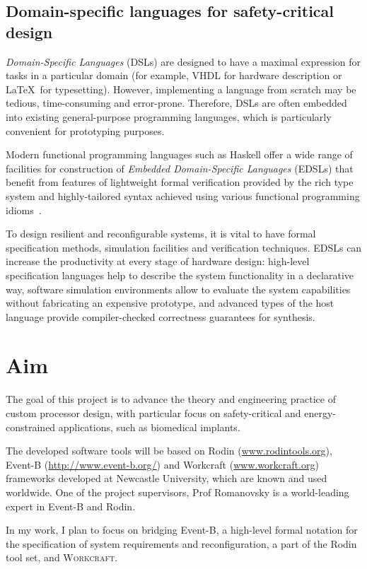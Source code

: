 \documentclass[10pt, a4paper]{article}
\begin{document}
\subsection{Domain-specific languages for safety-critical design}

\emph{Domain-Specific Languages} (DSLs) are designed to have a maximal 
expression for tasks in a particular domain (for example, VHDL for hardware
description or \LaTeX~for typesetting). However, implementing a language
from scratch may be tedious, time-consuming and error-prone. Therefore,
DSLs are often embedded into existing general-purpose programming languages,
which is particularly convenient for prototyping purposes.

Modern functional programming languages such as Haskell offer a wide range of
facilities for construction of \emph{Embedded Domain-Specific Languages} (EDSLs)
that benefit from features of lightweight formal verification provided by the
rich type system and highly-tailored syntax achieved using various functional
programming idioms~\cite{Hudak:1998:MDS:551789.853532}.

To design resilient and reconfigurable systems, it is vital to have formal
specification methods, simulation facilities and verification techniques.
EDSLs can increase the productivity at every stage of hardware design:
high-level specification languages help to describe the system functionality
in a declarative way, software simulation environments allow to evaluate the
system capabilities without fabricating an expensive prototype, and advanced
types of the host language provide compiler-checked correctness guarantees for
synthesis.

\section{Aim} 

The goal of this project is to advance the theory and
engineering practice of custom processor design, with
particular focus on safety-critical and energy-constrained
applications, such as biomedical implants.

The developed software tools will be based on Rodin 
(\url{www.rodintools.org}), Event-B (\url{http://www.event-b.org/}) and
Workcraft (\url{www.workcraft.org}) frameworks developed at Newcastle
University, which are known and used worldwide. One of the project supervisors,
Prof Romanovsky is a world-leading expert in Event-B and Rodin.

In my work, I plan to focus on bridging Event-B, a high-level formal notation
for the specification of system requirements 
and reconfiguration, a part of the Rodin tool set, and \textsc{Workcraft}. 
\end{document}
